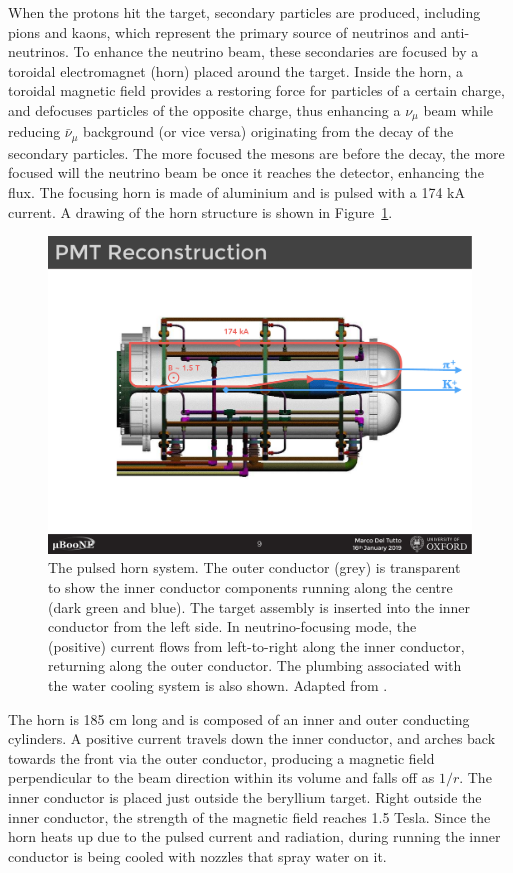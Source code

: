 When the protons hit the target, secondary particles are produced, including pions and kaons, which represent the primary source of neutrinos and anti-neutrinos. 
To enhance the neutrino beam, these secondaries are focused by a toroidal electromagnet (horn) placed around the target. 
Inside the horn, a toroidal magnetic field provides a restoring force for particles of a certain charge, and defocuses particles of the opposite charge, thus enhancing a $\nu_\mu$ beam while reducing $\bar{\nu}_\mu$ background (or vice versa) originating from the decay of the secondary particles. The more focused the mesons are before the decay, the more focused will the neutrino beam be once it reaches the detector, enhancing the flux. 
The focusing horn is made of aluminium and is pulsed with a 174 kA current. A drawing of the horn structure is shown in Figure~\ref{fig:horn}. 
\begin{figure}[]
\centering
\includegraphics[width=.80\textwidth]{images/MicroBooNE/horn}
\caption[MiniBooNE Horn]{The pulsed horn system. The outer conductor (grey) is transparent to show the inner conductor components running along the centre (dark green and blue). The target assembly is inserted into the inner conductor from the left side. In neutrino-focusing mode, the (positive) current flows from left-to-right along the inner conductor, returning along the outer conductor. The plumbing associated with the water cooling system is also shown. Adapted from \cite{miniboone_flux}.}
\label{fig:horn}
\end{figure}
The horn is 185 cm long and is composed of an inner and outer conducting cylinders. A positive current travels down the inner conductor, and arches back towards the front via the outer conductor, producing a magnetic field perpendicular to the beam direction within its volume and falls off as $1/r$. The inner conductor is placed just outside the beryllium target. Right outside the inner conductor, the strength of the magnetic field reaches 1.5 Tesla. Since the horn heats up due to the pulsed current and radiation, during running the inner conductor is being cooled with nozzles that spray water on it.
